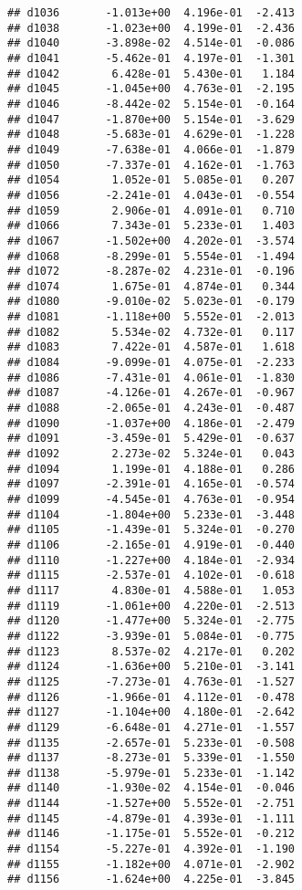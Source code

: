 \documentclass[
]{article}
\begin{document}
\begin{verbatim}
## d1036       -1.013e+00  4.196e-01  -2.413
## d1038       -1.023e+00  4.199e-01  -2.436
## d1040       -3.898e-02  4.514e-01  -0.086
## d1041       -5.462e-01  4.197e-01  -1.301
## d1042        6.428e-01  5.430e-01   1.184
## d1045       -1.045e+00  4.763e-01  -2.195
## d1046       -8.442e-02  5.154e-01  -0.164
## d1047       -1.870e+00  5.154e-01  -3.629
## d1048       -5.683e-01  4.629e-01  -1.228
## d1049       -7.638e-01  4.066e-01  -1.879
## d1050       -7.337e-01  4.162e-01  -1.763
## d1054        1.052e-01  5.085e-01   0.207
## d1056       -2.241e-01  4.043e-01  -0.554
## d1059        2.906e-01  4.091e-01   0.710
## d1066        7.343e-01  5.233e-01   1.403
## d1067       -1.502e+00  4.202e-01  -3.574
## d1068       -8.299e-01  5.554e-01  -1.494
## d1072       -8.287e-02  4.231e-01  -0.196
## d1074        1.675e-01  4.874e-01   0.344
## d1080       -9.010e-02  5.023e-01  -0.179
## d1081       -1.118e+00  5.552e-01  -2.013
## d1082        5.534e-02  4.732e-01   0.117
## d1083        7.422e-01  4.587e-01   1.618
## d1084       -9.099e-01  4.075e-01  -2.233
## d1086       -7.431e-01  4.061e-01  -1.830
## d1087       -4.126e-01  4.267e-01  -0.967
## d1088       -2.065e-01  4.243e-01  -0.487
## d1090       -1.037e+00  4.186e-01  -2.479
## d1091       -3.459e-01  5.429e-01  -0.637
## d1092        2.273e-02  5.324e-01   0.043
## d1094        1.199e-01  4.188e-01   0.286
## d1097       -2.391e-01  4.165e-01  -0.574
## d1099       -4.545e-01  4.763e-01  -0.954
## d1104       -1.804e+00  5.233e-01  -3.448
## d1105       -1.439e-01  5.324e-01  -0.270
## d1106       -2.165e-01  4.919e-01  -0.440
## d1110       -1.227e+00  4.184e-01  -2.934
## d1115       -2.537e-01  4.102e-01  -0.618
## d1117        4.830e-01  4.588e-01   1.053
## d1119       -1.061e+00  4.220e-01  -2.513
## d1120       -1.477e+00  5.324e-01  -2.775
## d1122       -3.939e-01  5.084e-01  -0.775
## d1123        8.537e-02  4.217e-01   0.202
## d1124       -1.636e+00  5.210e-01  -3.141
## d1125       -7.273e-01  4.763e-01  -1.527
## d1126       -1.966e-01  4.112e-01  -0.478
## d1127       -1.104e+00  4.180e-01  -2.642
## d1129       -6.648e-01  4.271e-01  -1.557
## d1135       -2.657e-01  5.233e-01  -0.508
## d1137       -8.273e-01  5.339e-01  -1.550
## d1138       -5.979e-01  5.233e-01  -1.142
## d1140       -1.930e-02  4.154e-01  -0.046
## d1144       -1.527e+00  5.552e-01  -2.751
## d1145       -4.879e-01  4.393e-01  -1.111
## d1146       -1.175e-01  5.552e-01  -0.212
## d1154       -5.227e-01  4.392e-01  -1.190
## d1155       -1.182e+00  4.071e-01  -2.902
## d1156       -1.624e+00  4.225e-01  -3.845

\end{verbatim}
\end{document}
